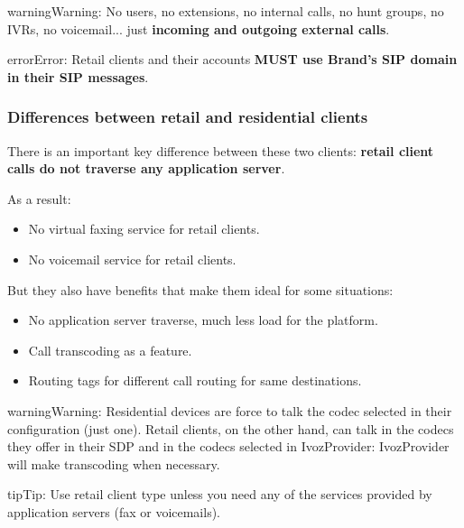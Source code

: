 \documentclass[letterpaper,10pt,english]{sphinxmanual}
\begin{document}
\begin{notice}{warning}{Warning:}
No users, no extensions, no internal calls, no hunt groups, no IVRs, no voicemail...
just \textbf{incoming and outgoing external calls}.
\end{notice}

\begin{notice}{error}{Error:}
Retail clients and their accounts \textbf{MUST use Brand's SIP domain in their SIP messages}.
\end{notice}


\subsubsection{Differences between retail and residential clients}
\label{administration_portal/brand/clients/retail:differences-between-retail-and-residential-clients}
There is an important key difference between these two clients: \textbf{retail client calls do not traverse
any application server}.

As a result:
\begin{itemize}
\item {} 
No virtual faxing service for retail clients.

\item {} 
No voicemail service for retail clients.

\end{itemize}

But they also have benefits that make them ideal for some situations:
\begin{itemize}
\item {} 
No application server traverse, much less load for the platform.

\item {} 
Call transcoding as a feature.

\item {} 
Routing tags for different call routing for same destinations.

\end{itemize}

\begin{notice}{warning}{Warning:}
Residential devices are force to talk the codec selected in their configuration (just one).
Retail clients, on the other hand, can talk in the codecs they offer in their SDP and in the
codecs selected in IvozProvider: IvozProvider will make transcoding when necessary.
\end{notice}

\begin{notice}{tip}{Tip:}
Use retail client type unless you need any of the services provided by application servers (fax or voicemails).
\end{notice}
\end{document}
